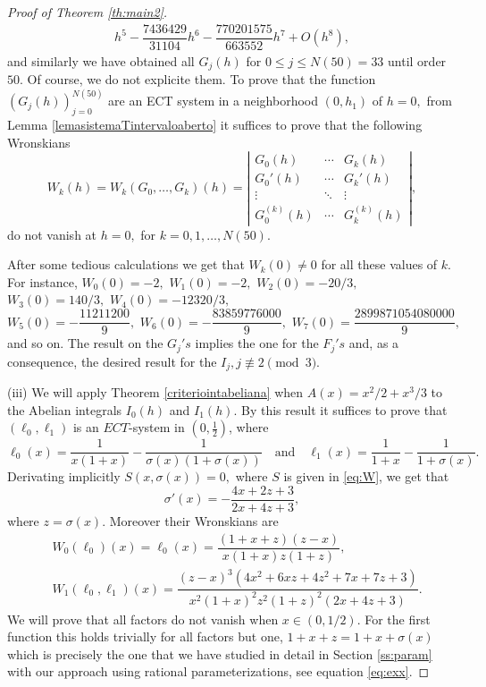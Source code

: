 \documentclass[12pt,a4paper,reqno]{amsart}
\begin{document}
\begin{proof}[Proof of Theorem \ref{th:main2}]
\begin{align*}
h^5 - \dfrac{7436429}{31104} h^6- \dfrac{770201575}{663552}
h^7+O(h^8),
    \end{align*}
and similarly we have obtained all $G_j(h)$ for $0\le j\le N(50)=
33$ until order $50.$ Of course, we do not explicite them. To prove
that the function $(G_j(h))_{j=0}^{N(50)}$ are an ECT system in a
neighborhood $(0,h_1)$ of $h=0, $ from Lemma
\ref{lemasistemaTintervaloaberto} it suffices to prove that the
following Wronskians
$$ W_k(h)= W_k(G_0,\ldots,G_k)(h) =  \left|\begin{array}{ccc}
    G_0(h) & \cdots & G_k(h) \\
    G_0'(h) &  \cdots & G_k'(h) \\
    \vdots &  \ddots & \vdots \\
    G_0^{(k)}(h)  & \cdots & G_k^{(k)}(h)
    \end{array} \right|,$$
do not vanish at $h=0,$ for $k=0,1,\dots,N(50).$

After some tedious calculations we get that $W_k(0)\ne0$ for all
these values of $k.$ For instance, $W_0(0)=-2,$ $W_1(0)=-2,$
$W_2(0)=-20/3,$ $W_3(0)=140/3,$ $W_4(0)=-12320/3,$
\[
W_5(0)= - \dfrac{11211200}{9},\,\, W_6(0)= -
\dfrac{83859776000}{9},\,\,W_7(0)= \dfrac{2899871054080000}{9},
\]
and so on. The result on the $G_j's$ implies the one for the $F_j's$
and, as a consequence, the desired result for the $I_j, j\not\equiv
2 \pmod 3.$




 (iii)   We will apply Theorem \ref{criteriointabeliana} when
    $A(x)=x^2/2+x^3/3$ to the Abelian integrals $I_0(h)$ and $I_1(h).$ By this
    result it suffices  to prove  that $(\ell_0,\ell_1)$ is an $ECT$-system in $\left(0,\frac{1}{2}\right)$,
     where
    \begin{equation*}
    \ell_0(x)= \dfrac{1}{x(1+ x)} - \dfrac{1}{\sigma(x)(1+ \sigma(x))}
    \quad \mbox{and}\quad \ell_1(x)=  \dfrac{1}{1+ x} - \dfrac{1}{1+ \sigma(x)}.
    \end{equation*}
    Derivating implicitly $S(x,\sigma(x))=0,$ where $S$ is given in
    \eqref{eq:W}, we get that
    \[
    \sigma'(x)=-\frac{4x+2z+3}{2x+4z+3},
    \]
where $z=\sigma(x).$ Moreover their  Wronskians are
    \begin{equation*}
    \begin{aligned}
    & W_0(\ell_0)(x) = \ell_0(x) = \dfrac{ (1+x+z)(z -x)}{x(1+x)z(1+z)}, \\
    & W_1(\ell_0, \ell_1)(x) = \dfrac{(z-x)^3
    (4x^2+6xz+4z^2+7x+7z+3)}{x^2(1+x)^2z^2(1+z)^2(2x+4z+3)}.
    \end{aligned}
    \end{equation*}
We will prove that all factors do not vanish when $x\in(0,1/2).$ For
the first function this holds trivially for all factors but one,
$1+x+z=1+x+\sigma(x)$ which is precisely the one that we have
studied in detail in Section \ref{ss:param} with our approach using
rational parameterizations, see equation \eqref{eq:exx}.


\end{proof}
\end{document}
